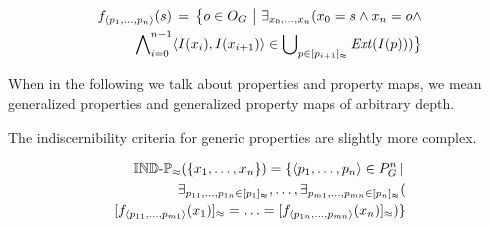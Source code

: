 \small
\begin{definition}
\begin{align}
\label{def:generalized_property_map}
  f_{\langle p_1,\ldots,p_n\rangle}(s)
\,=\,
  \big\{o \in O_G\,\,\big\vert\,\,
    \exists_{x_0,\ldots,x_n}(
      x_0 = s \land x_n = o \land\nonumber\\
      \bigwedge_{i=0}^{n-1}\nolimits
          \langle I(x_i),I(x_{i+1})\rangle
        \in
          \bigcup_{p \in [p_{i+1}]_{\approx}}\nolimits \mathit{Ext}(I(p))
    )
  \big\}\nonumber
\end{align}
\end{definition}
\normalsize

\noindent When in the following we talk about properties and property maps,
  we mean generalized properties and generalized property maps
  of arbitrary depth.

The indiscernibility criteria for generic properties
  are slightly more complex.

\small
\begin{definition}
\label{def:indiscernibility_criteria}
\begin{align}
  \indp_{\approx}(\set{\range{x_1}{x_n}})
=
  \setdef{
    \tuplerange{p_1}{p_n} \in P_G^n
  }{\\
      \exists_{\range{p_{11}}{p_{1n}} \in \equivset{p_1}},
    \ldots,
      \exists_{\range{p_{m1}}{p_{mn}} \in \equivset{p_n}}
    (\nonumber\\
        \equivset{f_{\tuplerange{p_{11}}{p_{m1}}} (x_1)}
      =
        \ldots
      =
        \equivset{f_{\tuplerange{p_{1n}}{p_{mn}}} (x_n)}
    )
  }\nonumber
\end{align}
\end{definition}
\normalsize

